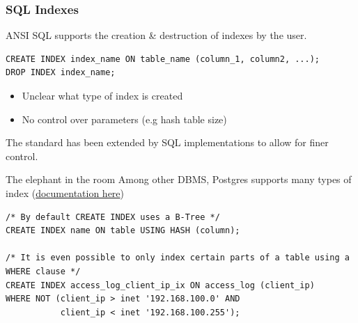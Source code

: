 \subsubsection{SQL Indexes}
ANSI SQL supports the creation \& destruction of indexes by the user.
\begin{verbatim}
CREATE INDEX index_name ON table_name (column_1, column2, ...);
DROP INDEX index_name;
\end{verbatim}
\begin{itemize}
    \item Unclear what type of index is created
    \item No control over parameters (e.g hash table size)
\end{itemize}
The standard has been extended by SQL implementations to allow for finer control.
\begin{sidenotebox}{The elephant in the room}
    Among other DBMS, Postgres supports many types of index (\href{https://www.postgresql.org/docs/current/indexes.html}{documentation here})
    \begin{verbatim}
/* By default CREATE INDEX uses a B-Tree */
CREATE INDEX name ON table USING HASH (column);

/* It is even possible to only index certain parts of a table using a WHERE clause */
CREATE INDEX access_log_client_ip_ix ON access_log (client_ip)
WHERE NOT (client_ip > inet '192.168.100.0' AND
           client_ip < inet '192.168.100.255');
    \end{verbatim}
\end{sidenotebox}

